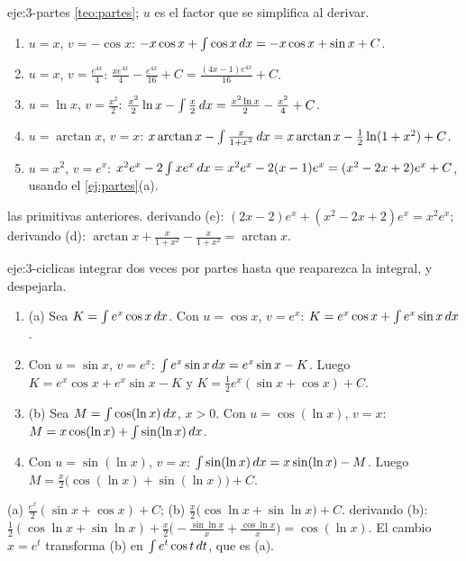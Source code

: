 \begin{solucion}{eje:3-partes}
\planteamiento \cref{teo:partes}; $u$ es el factor que se simplifica al derivar.
\pasos
\begin{enumerate}[label=(\alph*)]
  \item $u=x$, $v=-\cos x$: $-x\cos x+\int\cos x\mathop{}\!d x=-x\cos x+\sin x+C$.
  \item $u=x$, $v=\frac{e^{4x}}{4}$: $\frac{xe^{4x}}{4}-\frac{e^{4x}}{16}+C=\frac{(4x-1)e^{4x}}{16}+C$.
  \item $u=\ln x$, $v=\frac{x^{2}}{2}$: $\frac{x^{2}}{2}\ln x-\int\frac x2\mathop{}\!d x=\frac{x^{2}\ln x}{2}-\frac{x^{2}}{4}+C$.
  \item $u=\arctan x$, $v=x$: $x\arctan x-\int\frac{x}{1+x^{2}}\mathop{}\!d x=x\arctan x-\frac12\ln(1+x^{2})+C$.
  \item $u=x^{2}$, $v=e^{x}$: $x^{2}e^{x}-2\int xe^{x}\mathop{}\!d x=x^{2}e^{x}-2(x-1)e^{x}=(x^{2}-2x+2)e^{x}+C$, usando el \cref{ej:partes}(a).
\end{enumerate}
\resultado las primitivas anteriores.
\comprobacion derivando (e): $(2x-2)e^{x}+(x^{2}-2x+2)e^{x}=x^{2}e^{x}$; derivando (d): $\arctan x+\frac{x}{1+x^{2}}-\frac{x}{1+x^{2}}=\arctan x$.
\end{solucion}

\begin{solucion}{eje:3-ciclicas}
\planteamiento integrar dos veces por partes hasta que reaparezca la integral, y despejarla.
\pasos
\begin{enumerate}[label=\arabic*.]
  \item (a) Sea $K=\int e^{x}\cos x\mathop{}\!d x$. Con $u=\cos x$, $v=e^{x}$: $K=e^{x}\cos x+\int e^{x}\sin x\mathop{}\!d x$.
  \item Con $u=\sin x$, $v=e^{x}$: $\int e^{x}\sin x\mathop{}\!d x=e^{x}\sin x-K$. Luego $K=e^{x}\cos x+e^{x}\sin x-K$ y $K=\frac12e^{x}(\sin x+\cos x)+C$.
  \item (b) Sea $M=\int\cos(\ln x)\mathop{}\!d x$, $x>0$. Con $u=\cos(\ln x)$, $v=x$: $M=x\cos(\ln x)+\int\sin(\ln x)\mathop{}\!d x$.
  \item Con $u=\sin(\ln x)$, $v=x$: $\int\sin(\ln x)\mathop{}\!d x=x\sin(\ln x)-M$. Luego $M=\frac x2\bigl(\cos(\ln x)+\sin(\ln x)\bigr)+C$.
\end{enumerate}
\resultado (a) $\frac{e^{x}}{2}(\sin x+\cos x)+C$; (b) $\frac x2\bigl(\cos\ln x+\sin\ln x\bigr)+C$.
\comprobacion derivando (b): $\frac12(\cos\ln x+\sin\ln x)+\frac x2\bigl(-\frac{\sin\ln x}{x}+\frac{\cos\ln x}{x}\bigr)=\cos(\ln x)$. El cambio $x=e^{t}$ transforma (b) en $\int e^{t}\cos t\mathop{}\!d t$, que es (a).
\end{solucion}


